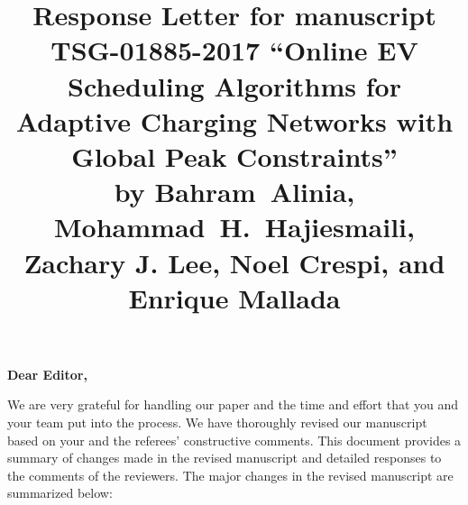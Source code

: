 \documentclass[11pt]{article}
\begin{document}
\title{Response Letter for manuscript TSG-01885-2017 ``Online EV Scheduling Algorithms for Adaptive Charging Networks with Global Peak Constraints'' \\
	\vspace{4mm} \large
	by  Bahram~Alinia, Mohammad~H.~Hajiesmaili, Zachary J. Lee, Noel Crespi, and Enrique Mallada
}

\maketitle

\textbf{Dear Editor,}

We are very grateful for handling our paper and the time and effort that you and your team put into the process. We have thoroughly revised our manuscript based on your and the referees' constructive comments. This document provides a summary of changes made in the revised manuscript and detailed responses to the comments of the reviewers. The major changes in the revised manuscript are summarized below:
\end{document}
